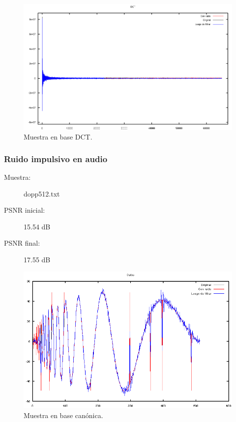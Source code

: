 \documentclass[a4paper,10pt,twoside]{article}
\begin{document}
\begin{figure}[H]
  \centering
  \includegraphics[width=15cm]{graficos/lena_aditivo_atenuar_dct.png} 
  \caption{Muestra en base DCT.}
\end{figure}


\subsubsection{Ruido impulsivo en audio}

\begin{description}
  \item[Muestra:] dopp512.txt
  \item[PSNR inicial:] 15.54 dB
  \item[PSNR final:] 17.55 dB
\end{description}

\begin{figure}[H]
  \centering
  \includegraphics[width=15cm]{graficos/dopp_impulsivo_atenuar_muestra.png} 
  \caption{Muestra en base canónica.}
\end{figure}
\end{document}

